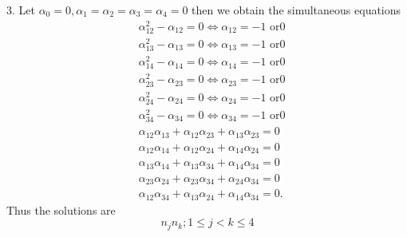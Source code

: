 \documentclass[aps,preprint]{revtex4}%
\begin{document}
3. Let $\alpha_{0}=0,\alpha_{1}=\alpha_{2}=\alpha_{3}=\alpha_{4}=0$ then we
obtain the simultaneous equations
\begin{align}
&  \alpha_{12}^{2}-\alpha_{12}=0\Leftrightarrow\alpha_{12}=-1\text{ or
}0\nonumber\\
&  \alpha_{13}^{2}-\alpha_{13}=0\Leftrightarrow\alpha_{13}=-1\text{ or
}0\nonumber\\
&  \alpha_{14}^{2}-\alpha_{14}=0\Leftrightarrow\alpha_{14}=-1\text{ or
}0\nonumber\\
&  \alpha_{23}^{2}-\alpha_{23}=0\Leftrightarrow\alpha_{23}=-1\text{ or
}0\nonumber\\
&  \alpha_{24}^{2}-\alpha_{24}=0\Leftrightarrow\alpha_{24}=-1\text{ or
}0\nonumber\\
&  \alpha_{34}^{2}-\alpha_{34}=0\Leftrightarrow\alpha_{34}=-1\text{ or
}0\nonumber\\
&  \alpha_{12}\alpha_{13}+\alpha_{12}\alpha_{23}+\alpha_{13}\alpha
_{23}=0\nonumber\\
&  \alpha_{12}\alpha_{14}+\alpha_{12}\alpha_{24}+\alpha_{14}\alpha
_{24}=0\nonumber\\
&  \alpha_{13}\alpha_{14}+\alpha_{13}\alpha_{34}+\alpha_{14}\alpha
_{34}=0\nonumber\\
&  \alpha_{23}\alpha_{24}+\alpha_{23}\alpha_{34}+\alpha_{24}\alpha
_{34}=0\nonumber\\
&  \alpha_{12}\alpha_{34}+\alpha_{13}\alpha_{24}+\alpha_{14}\alpha_{34}=0.
\end{align}
Thus the solutions are
\[
n_{j}n_{k};1\leq j<k\leq4
\]
\end{document}
